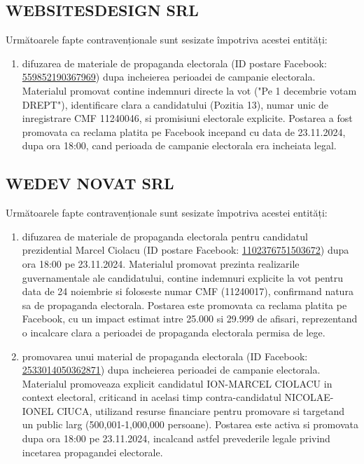 \documentclass[a4paper,12pt]{article}
\begin{document}
\vspace{0.5cm}

\subsection{WEBSITESDESIGN SRL}
Următoarele fapte contravenționale sunt sesizate împotriva acestei entități:

\begin{enumerate}[leftmargin=*, label=\arabic*.)]
    \item difuzarea de materiale de propaganda electorala (ID postare Facebook: \href{https://www.facebook.com/ads/library/?id=559852190367969}{559852190367969}) dupa incheierea perioadei de campanie electorala. Materialul promovat contine indemnuri directe la vot ("Pe 1 decembrie votam DREPT"), identificare clara a candidatului (Pozitia 13), numar unic de inregistrare CMF 11240046, si promisiuni electorale explicite. Postarea a fost promovata ca reclama platita pe Facebook incepand cu data de 23.11.2024, dupa ora 18:00, cand perioada de campanie electorala era incheiata legal.
\end{enumerate}

\vspace{0.5cm}

\subsection{WEDEV NOVAT SRL}
Următoarele fapte contravenționale sunt sesizate împotriva acestei entități:

\begin{enumerate}[leftmargin=*, label=\arabic*.)]
    \item difuzarea de materiale de propaganda electorala pentru candidatul prezidential Marcel Ciolacu (ID postare Facebook: \href{https://www.facebook.com/ads/library/?id=1102376751503672}{1102376751503672}) dupa ora 18:00 pe 23.11.2024. Materialul promovat prezinta realizarile guvernamentale ale candidatului, contine indemnuri explicite la vot pentru data de 24 noiembrie si foloseste numar CMF (11240017), confirmand natura sa de propaganda electorala. Postarea este promovata ca reclama platita pe Facebook, cu un impact estimat intre 25.000 si 29.999 de afisari, reprezentand o incalcare clara a perioadei de propaganda electorala permisa de lege.
    \item promovarea unui material de propaganda electorala (ID Facebook: \href{https://www.facebook.com/ads/library/?id=2533014050362871}{2533014050362871}) dupa incheierea perioadei de campanie electorala. Materialul promoveaza explicit candidatul ION-MARCEL CIOLACU in context electoral, criticand in acelasi timp contra-candidatul NICOLAE-IONEL CIUCA, utilizand resurse financiare pentru promovare si targetand un public larg (500,001-1,000,000 persoane). Postarea este activa si promovata dupa ora 18:00 pe 23.11.2024, incalcand astfel prevederile legale privind incetarea propagandei electorale.
\end{enumerate}
\end{document}
